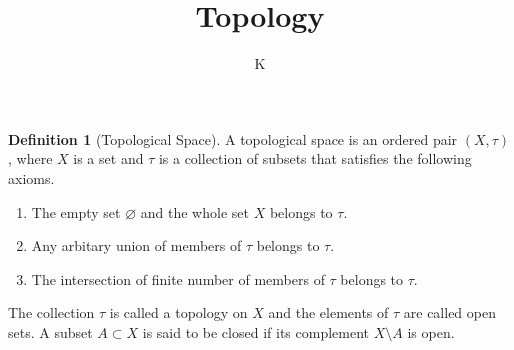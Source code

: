 \documentclass[a4paper]{book}
\title{Topology}
\author{K}
\theoremstyle{definition}
\newtheorem{definition}{Definition}[chapter]
\begin{document}
\maketitle
\tableofcontents
\begin{definition}[Topological Space]
    A {\color{maththen}topological space} is an ordered pair \((X, \tau)\), where \(X\) is a {\color{mathif}set} and \(\tau\) is a {\color{mathif}collection of subsets} that satisfies the following axioms.
    \begin{enumerate}
        \item The {\color{mathif}empty set} \(\varnothing\) and the {\color{mathif}whole set} \(X\) belongs to \(\tau\).
        \item Any {\color{mathif}arbitary union} of members of \(\tau\) belongs to \(\tau\).
        \item The {\color{mathif}intersection of finite number} of members of \(\tau\) belongs to \(\tau\).
    \end{enumerate}
    The {\color{mathif}collection} \(\tau\) is called a {\color{maththen}topology} on \(X\) and the {\color{mathif}elements} of \(\tau\) are called {\color{maththen}open sets}. A {\color{mathif}subset} \(A \subset X\) is said to be {\color{maththen}closed} if its {\color{mathif}complement} \(X \setminus A\) is {\color{mathif}open}.
\end{definition}

\end{document}
